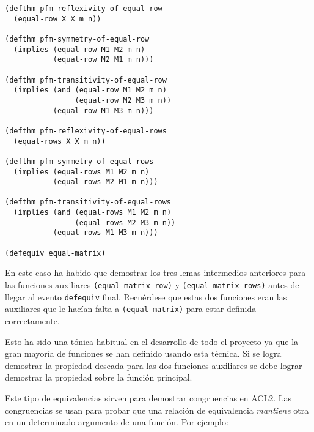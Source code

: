 \documentclass[a4paper,10pt]{article}
\begin{document}
\par \vspace{16pt}

\begin{lstlisting}[language=clips]
(defthm pfm-reflexivity-of-equal-row
  (equal-row X X m n))

(defthm pfm-symmetry-of-equal-row
  (implies (equal-row M1 M2 m n)
           (equal-row M2 M1 m n)))

(defthm pfm-transitivity-of-equal-row
  (implies (and (equal-row M1 M2 m n)
                (equal-row M2 M3 m n))
           (equal-row M1 M3 m n)))

(defthm pfm-reflexivity-of-equal-rows
  (equal-rows X X m n))

(defthm pfm-symmetry-of-equal-rows
  (implies (equal-rows M1 M2 m n)
           (equal-rows M2 M1 m n)))

(defthm pfm-transitivity-of-equal-rows
  (implies (and (equal-rows M1 M2 m n)
                (equal-rows M2 M3 m n))
           (equal-rows M1 M3 m n)))

(defequiv equal-matrix)
\end{lstlisting}

\par \vspace{10pt}

En este caso ha habido que demostrar los tres lemas intermedios anteriores para las funciones auxiliares \texttt{(equal-matrix-row)} y \texttt{(equal-matrix-rows)} antes de llegar al evento \texttt{defequiv} final. Recuérdese que estas dos funciones eran las auxiliares que le hacían falta a \texttt{(equal-matrix)} para estar definida correctamente.

\par \vspace{10pt}

Esto ha sido una tónica habitual en el desarrollo de todo el proyecto ya que la gran mayoría de funciones se han definido usando esta técnica. Si se logra demostrar la propiedad deseada para las dos funciones auxiliares se debe lograr demostrar la propiedad sobre la función principal.

\par \vspace{10pt}

Este tipo de equivalencias sirven para demostrar congruencias en ACL2. Las congruencias se usan para probar que una relación de equivalencia \emph{mantiene} otra en un determinado argumento de una función. Por ejemplo:
\end{document}
